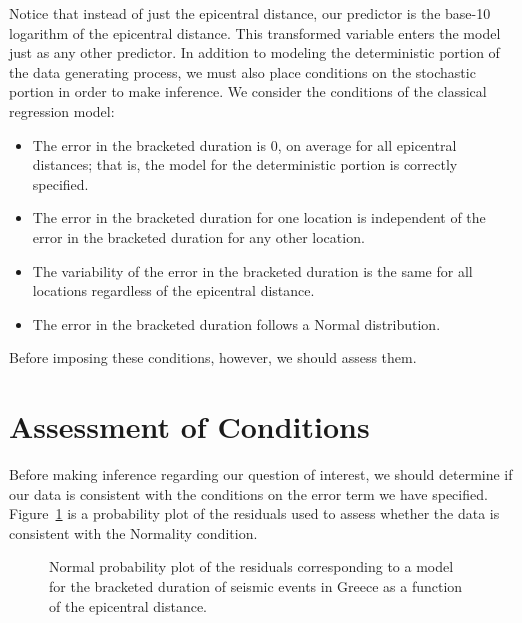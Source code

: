 \documentclass[
  letterpaper,
  DIV=11,
  numbers=noendperiod]{scrreprt}
\providecommand{\tightlist}{%
  \setlength{\itemsep}{0pt}\setlength{\parskip}{0pt}}\usepackage{longtable,booktabs,array}
\theoremstyle{definition}
\theoremstyle{definition}
\theoremstyle{plain}
\theoremstyle{remark}
\begin{document}
Notice that instead of just the epicentral distance, our predictor is
the base-10 logarithm of the epicentral distance. This transformed
variable enters the model just as any other predictor. In addition to
modeling the deterministic portion of the data generating process, we
must also place conditions on the stochastic portion in order to make
inference. We consider the conditions of the classical regression model:

\begin{itemize}
\tightlist
\item
  The error in the bracketed duration is 0, on average for all
  epicentral distances; that is, the model for the deterministic portion
  is correctly specified.
\item
  The error in the bracketed duration for one location is independent of
  the error in the bracketed duration for any other location.
\item
  The variability of the error in the bracketed duration is the same for
  all locations regardless of the epicentral distance.
\item
  The error in the bracketed duration follows a Normal distribution.
\end{itemize}

Before imposing these conditions, however, we should assess them.

\section{Assessment of Conditions}\label{assessment-of-conditions}

Before making inference regarding our question of interest, we should
determine if our data is consistent with the conditions on the error
term we have specified. Figure~\ref{fig-regrecap-normality} is a
probability plot of the residuals used to assess whether the data is
consistent with the Normality condition.

\begin{figure}


\caption{\label{fig-regrecap-normality}Normal probability plot of the
residuals corresponding to a model for the bracketed duration of seismic
events in Greece as a function of the epicentral distance.}

\end{figure}%
\end{document}
